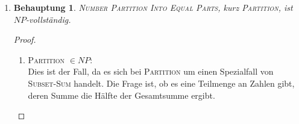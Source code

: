 \documentclass[a4paper]{scrartcl}
\newtheorem*{proposition}{Behauptung}
\begin{document}
\begin{enumerate}[label=\bfseries \arabic*.]
\begin{enumerate}
\begin{proof}
\begin{enumerate}
\begin{itemize}
                            $S$, da
                            \begin{itemize}
                                \item
                                    für jedes Atom $a$ ist genau ein Literal
                                    $a$ oder $\lnot a$ mit wahr belegt
                                \item
                                    in jeder Klauselmenge ist mindestens ein
                                    Literal wahr, $\bot$ ist nie wahr
                            \end{itemize}
                            Damit ist keine Menge $C \in \mathcal{C}$ komplett
                            in $T$ oder $S \setminus T$ enthalten und dies ist
                            ein Set Splitting.

                        \item $\Leftarrow$: \\
                            Sei $(S_1,S_2)$ ein Set Splitting und dabei sei
                            o.\,B.\,d.\,A. $\bot \in S_2$.
                            Es sind also für jede Atom das positive und das
                            negative Literal in verschiedenen Mengen.
                            Belegt man die Literale in $S_1$ mit wahr, ergibt
                            sich also eine valide Belegung.
                            Weiterhin ist mindestens ein Literal aus jeder
                            Klausel in $S_1$ enthalten (denn $\bot \in S_2$).
                            Damit erhält man auch eine erfüllende Belegung von
                            $\phi$.
                    \end{itemize}
                    3-SAT ist auf \textsc{Set Splitting} reduzierbar.
            \end{enumerate}
            Aus i. und ii. folgt die Behauptung.
        \end{proof}

    \item %
        \begin{proposition}
            \textsc{Number Partition Into Equal Parts}, kurz
            \textsc{Partition}, ist $NP$-vollständig.
        \end{proposition}
        \begin{proof}
            \hfill \\
            \begin{enumerate}
                \item \textsc{Partition} $\in NP$: \\
                    Dies ist der Fall, da es sich bei \textsc{Partition} um
                    einen Spezialfall von \textsc{Subset-Sum} handelt.
                    Die Frage ist, ob es eine Teilmenge an Zahlen gibt, deren
                    Summe die Hälfte der Gesamtsumme ergibt.


\end{enumerate}
\end{proof}
\end{enumerate}
\end{enumerate}
\end{document}
